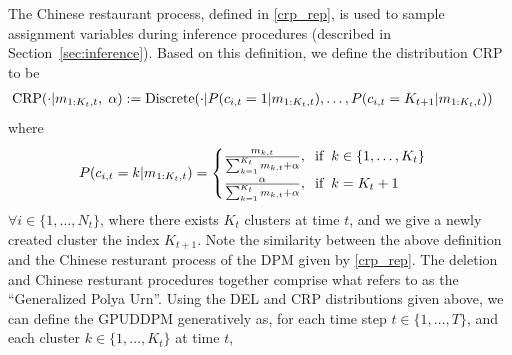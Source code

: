 \documentclass[smallcondensed, final]{svjour3}
\begin{document}
The Chinese restaurant process, defined in \eqref{crp_rep}, is used to sample assignment variables during inference procedures (described in Section~\ref{sec:inference}). Based on this definition, we define the distribution CRP to be
\begin{equation}
\label{CRP}
\begin{split}
\text{CRP} & (\cdot | m_{1:K_{t},t}, \hspace{1mm} \alpha) :=
\text{Discrete}(\cdot | P(c_{i,t}=1 | m_{1:K_{t},t}), \ldots, P(c_{i,t}=K_{t+1}  | m_{1:K_{t},t}))
\end{split}
\end{equation}
where
\begin{equation}
P(c_{i,t}=k  | m_{1:K_{t},t}) = 
\begin{cases}
\frac{m_{k,t}}{\sum_{k=1}^{K_{t}} m_{k,t} + \alpha}, \hspace{2mm} \text{if} \hspace{2mm} k \in \{ 1, \ldots, K_{t} \} \\
\frac{\alpha}{\sum_{k=1}^{K_{t}} m_{k,t} + \alpha}, \hspace{2mm} \text{if} \hspace{2mm} k = K_{t} + 1
\end{cases}
\end{equation}
$\forall i \in \{1, \ldots, N_{t} \}$, where there exists $K_{t}$ clusters at time $t$, and we give a newly created cluster the index $K_{t+1}$. Note the similarity between the above definition and the Chinese resturant process of the DPM given by \eqref{crp_rep}. The deletion and Chinese resturant procedures together comprise what \cite{caron_2007} refers to as the ``Generalized Polya Urn''. Using the DEL and CRP distributions given above, we can define the GPUDDPM generatively as, for each time step $t \in \{1, \ldots, T\}$, and each cluster $k \in \{ 1, \ldots, K_{t} \}$ at time $t$,  %
\end{document}

